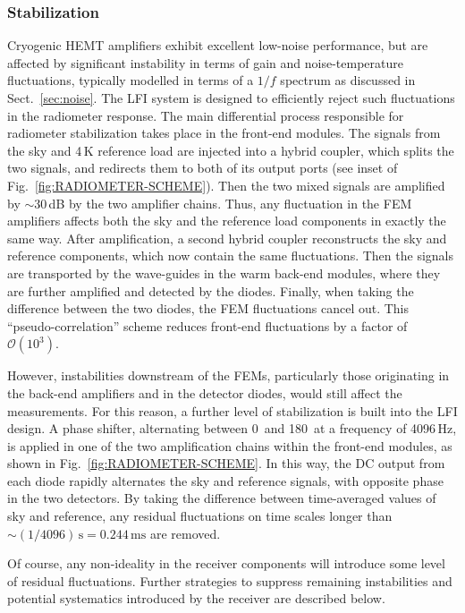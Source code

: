 \documentclass[onecolumn]{aa}
\begin{document}
\subsubsection{Stabilization}

Cryogenic HEMT amplifiers exhibit excellent low-noise performance, but
are affected by significant instability in terms of gain and
noise-temperature fluctuations, typically modelled in terms of a $1/f$
spectrum as discussed in Sect.~\ref{sec:noise}. The LFI system is
designed to efficiently reject such fluctuations in the radiometer
response. The main differential process responsible for radiometer
stabilization takes place in the front-end modules. The signals from
the sky and 4\,K reference load are injected into a hybrid coupler,
which splits the two signals, and redirects them to both of its output
ports (see inset of Fig.~\ref{fig:RADIOMETER-SCHEME}). Then the two
mixed signals are amplified by $\sim$30\,dB by the two amplifier
chains. Thus, any fluctuation in the FEM amplifiers affects both the
sky and the reference load components in exactly the same way. After
amplification, a second hybrid coupler reconstructs the sky and
reference components, which now contain the same fluctuations. Then
the signals are transported by the wave-guides in the warm back-end
modules, where they are further amplified and detected by the
diodes. Finally, when taking the difference between the two diodes,
the FEM fluctuations cancel out. This ``pseudo-correlation'' scheme
reduces front-end fluctuations by a factor of $\mathcal{O}(10^{3})$.

However, instabilities downstream of the FEMs, particularly those
originating in the back-end amplifiers and in the detector diodes,
would still affect the measurements. For this reason, a further level
of stabilization is built into the LFI design. A phase shifter,
alternating between 0\deg\ and 180\deg\ at a frequency of 4096\,Hz,
is applied in one of the two amplification chains within the front-end
modules, as shown in Fig.~\ref{fig:RADIOMETER-SCHEME}. In this way, the DC
output from each diode rapidly alternates the sky and reference
signals, with opposite phase in the two detectors. By taking the
difference between time-averaged values of sky and reference, any
residual fluctuations on time scales longer than ${\sim (1/4096)\,\mathrm s=
0.244\,\mathrm{ms}}$ are removed.

Of course, any non-ideality in the receiver components will introduce
some level of residual fluctuations. Further strategies to suppress
remaining instabilities and potential systematics introduced by the
receiver are described below.
\end{document}
